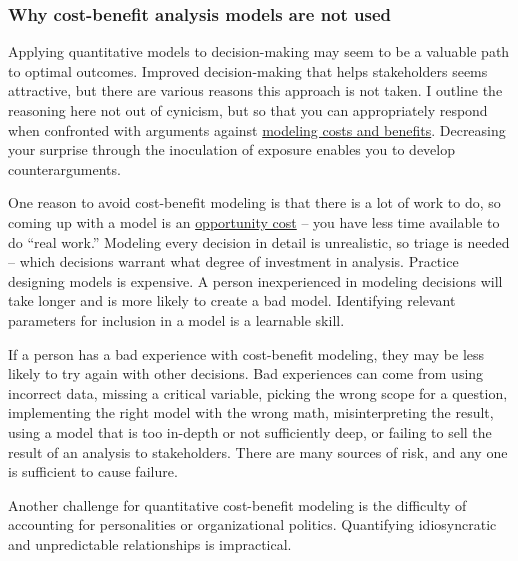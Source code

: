 \subsubsection*{Why cost-benefit analysis models are not used}

Applying quantitative models to decision-making may seem to be a valuable path to optimal outcomes. Improved decision-making that helps stakeholders seems attractive, but there are various reasons this approach is not taken. I outline the reasoning here not out of cynicism, but so that you can appropriately respond when confronted with arguments against \href{https://en.wikipedia.org/wiki/Cost\%E2\%80\%93benefit_analysis}{modeling costs and benefits}.\iftoggle{WPinmargin}{\marginpar{$>$Wikipedia: cost-benefit modeling}}{}
%
Decreasing your surprise through the inoculation of exposure enables you to develop counterarguments. 

One reason to avoid cost-benefit modeling is that there is a lot of work to do, so coming up with a model is an \href{https://en.wikipedia.org/wiki/Opportunity_cost}{opportunity cost} -- you have less time available to do ``real work.'' 
\iftoggle{WPinmargin}{\marginpar{$>$Wikipedia: opportunity cost}}{}
Modeling every decision in detail is unrealistic, so triage is needed -- which decisions warrant what degree of investment in analysis. Practice designing models is expensive. A person inexperienced in modeling decisions will take longer and is more likely to create a bad model. Identifying relevant parameters for inclusion in a model is a learnable skill. 

If a person has a bad experience with cost-benefit modeling, they may be less likely to try again with other decisions. Bad experiences can come from using incorrect data, missing a critical variable, picking the wrong scope for a question, implementing the right model with the wrong math, misinterpreting the result, using a model that is too in-depth or not sufficiently deep, or failing to sell the result of an analysis to stakeholders. There are many sources of risk, and any one is sufficient to cause failure.

Another challenge for quantitative cost-benefit modeling is the difficulty of accounting for personalities or organizational politics. Quantifying idiosyncratic and unpredictable relationships is impractical. %

